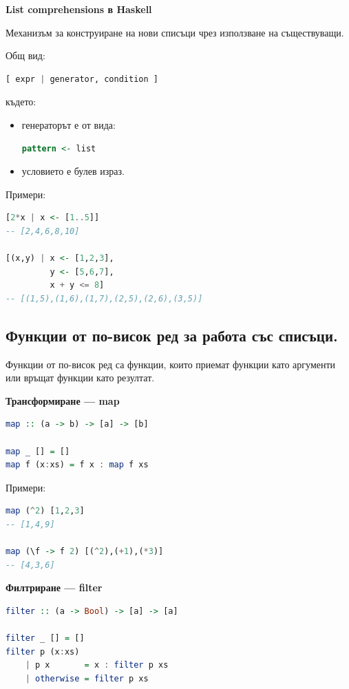 \documentclass{article}
\renewcommand{\\}{\newline}
\begin{document}
\textbf{List comprehensions в Haskell}

Механизъм за конструиране на нови списъци чрез използване на съществуващи.

Общ вид:
\begin{lstlisting}[language=haskell]
[ expr | generator, condition ]
\end{lstlisting}

където:
\begin{itemize}
    \item генераторът е от вида:
\begin{lstlisting}[language=haskell]
pattern <- list
\end{lstlisting}
    \item условието е булев израз.
\end{itemize}

Примери:
\begin{lstlisting}[language=haskell]
[2*x | x <- [1..5]]
-- [2,4,6,8,10]

[(x,y) | x <- [1,2,3],
         y <- [5,6,7],
         x + y <= 8]
-- [(1,5),(1,6),(1,7),(2,5),(2,6),(3,5)]
\end{lstlisting}

\subsection{Функции от по-висок ред за работа със списъци.}

Функции от по-висок ред са функции, които приемат функции като аргументи или връщат функции като резултат.

\textbf{Трансформиране --- map}

\begin{lstlisting}[language=haskell]
map :: (a -> b) -> [a] -> [b]

map _ [] = []
map f (x:xs) = f x : map f xs
\end{lstlisting}

Примери:
\begin{lstlisting}[language=haskell]
map (^2) [1,2,3]
-- [1,4,9]

map (\f -> f 2) [(^2),(+1),(*3)]
-- [4,3,6]
\end{lstlisting}

\textbf{Филтриране --- filter}

\begin{lstlisting}[language=haskell]
filter :: (a -> Bool) -> [a] -> [a]

filter _ [] = []
filter p (x:xs)
    | p x       = x : filter p xs
    | otherwise = filter p xs
\end{lstlisting}
\end{document}
